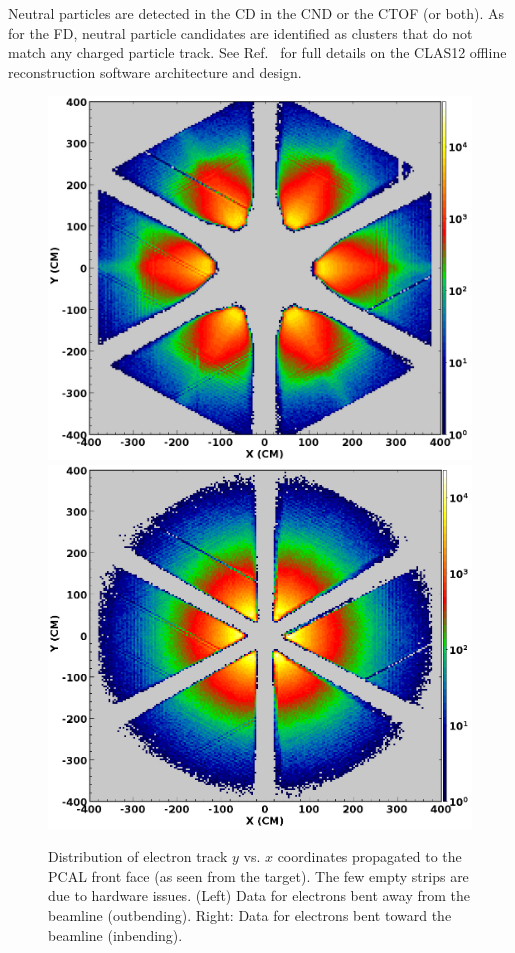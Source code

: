 \documentclass[final,3p]{elsarticle}
\begin{document}
\begin{twocolumn}
Neutral particles are detected in the CD in the CND or the CTOF (or both). As for the FD, neutral particle candidates
are identified as clusters that do not match any charged particle track. See Ref.~\cite{Software} for full details on
the CLAS12 offline reconstruction software architecture and design.

\begin{figure}[t!]
\centerline{\includegraphics[width=1.0\columnwidth]{e-outbending.png}
\hspace{0.5cm}\includegraphics[width=1.0\columnwidth]{e-inbending.png}}
\caption{Distribution of electron track $y$ vs. $x$ coordinates propagated to the PCAL front face (as seen from
  the target). The few empty strips are due to hardware issues. (Left) Data for electrons bent away from the
  beamline (outbending). Right: Data for electrons bent toward the beamline (inbending).} 
\label{electrons-xy}
\end{figure}


\end{twocolumn}
\end{document}

